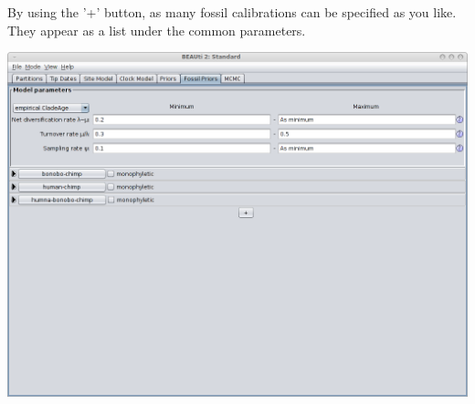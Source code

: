 \documentclass{article}
\begin{document}
By using the '+' button, as many fossil calibrations can be specified as you like.
They appear as a list under the common parameters.
\begin{center}\includegraphics[width=\textwidth,clip=true,trim=0 300 0 0]{fossilPriorsTab3.png}\end{center}
\end{document}

